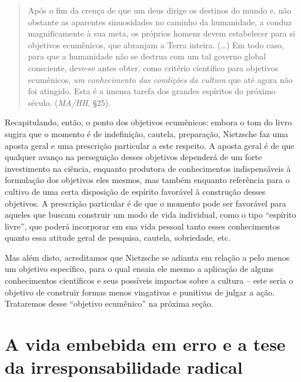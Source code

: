 \documentclass[
	12pt,				%
	openright,			%
	oneside,			%
	a4paper,			%
	english,			%
	french,				%
	spanish,			%
	brazil				%
	]{abntex2}
\begin{document}
\begin{quotation}
Após o fim da crença de que um deus dirige os destinos do mundo e, não obstante as aparentes sinuosidades no caminho da humanidade, a conduz magnificamente à sua meta, os próprios homens devem estabelecer para si objetivos ecumênicos, que abranjam a Terra inteira. (…) Em todo caso, para que a humanidade não se destrua com um tal governo global consciente, deve-se antes obter, como critério científico para objetivos ecumênicos, \textit{um conhecimento das condições da cultura} que até agora não foi atingido. Esta é a imensa tarefa dos grandes espíritos do próximo século. (\textit{MA/HH}, §25).
\end{quotation}

Recapitulando, então, o ponto dos objetivos ecumênicos: embora o tom do livro sugira que o momento é de indefinição, cautela, preparação, Nietzsche faz uma aposta geral e uma prescrição particular a este respeito. A aposta geral é de que qualquer avanço na perseguição desses objetivos dependerá de um forte investimento na ciência, enquanto produtora de conhecimentos indispensáveis à formulação dos objetivos eles mesmos, mas também enquanto referência para o cultivo de uma certa disposição de espírito favorável à construção desses objetivos. A prescrição particular é de que o momento pode ser favorável para aqueles que buscam construir um modo de vida individual, como o tipo “espírito livre”, que poderá incorporar em sua vida pessoal tanto esses conhecimentos quanto essa atitude geral de pesquisa, cautela, sobriedade, etc.

	Mas além disto, acreditamos que Nietzsche se adianta em relação a pelo menos um objetivo específico, para o qual ensaia ele mesmo a aplicação de alguns conhecimentos científicos e seus possíveis impactos sobre a cultura – este seria o objetivo de construir formas menos vingativas e punitivas de julgar a ação. Trataremos desse “objetivo ecumênico” na próxima seção.
	
\section{A vida embebida em erro e a tese da irresponsabilidade radical}
\end{document}
